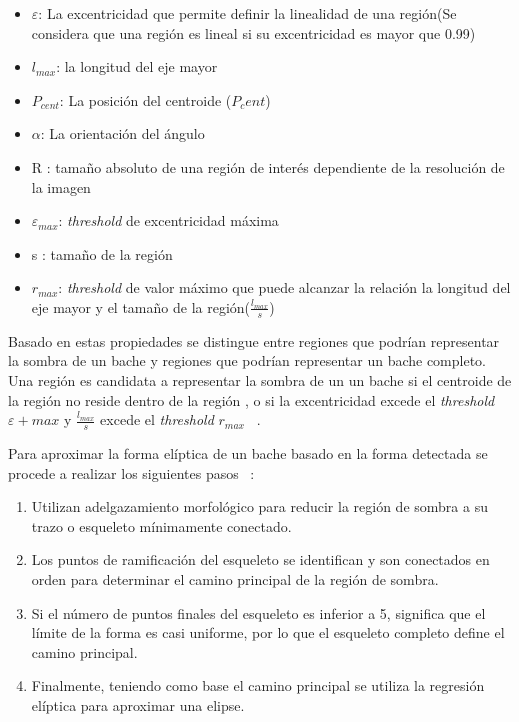 	\begin{itemize}
		\item $\varepsilon$: La excentricidad que permite definir la linealidad de una región(Se considera que una región es lineal si su excentricidad
			es mayor que 0.99)
		\item $l_{max}$: la longitud del eje mayor 
		\item $P_{cent}$: La posición del centroide ($P_cent$)
		\item $\alpha$: La orientación del ángulo
		\item R : tamaño absoluto de una región de interés dependiente de la resolución de la imagen
		\item $\varepsilon_{max}$: \emph{threshold} de excentricidad máxima
		\item s : tamaño de la región
		\item $r_{max}$: \emph{threshold} de valor máximo que puede alcanzar la relación la longitud del eje mayor y el tamaño de la región($\frac{l_{max}
			}{s}$) \end{itemize} 

	Basado en estas propiedades se distingue entre regiones que podrían representar la sombra de un bache y regiones que podrían representar un bache
	completo. Una región es candidata a representar la sombra de un un bache si el centroide de la región no reside dentro de la región , o si la
	excentricidad excede el \emph{threshold} $\varepsilon+{max}$ y $\frac{l_{max}}{s}$ excede el \emph{threshold} $r_{max}$ ~.



	Para aproximar la forma elíptica de un bache basado en la forma detectada se procede a realizar los siguientes pasos ~:

	\begin{enumerate}
		\item Utilizan adelgazamiento morfológico para reducir la región de sombra  a su trazo o esqueleto mínimamente conectado.
		\item Los puntos de ramificación del esqueleto se identifican y son conectados en orden para determinar el camino principal de la región de sombra.
		\item Si el número de puntos finales del esqueleto es inferior a 5, significa que el límite de la forma es casi uniforme, por lo que el esqueleto
			completo define el camino principal.
		\item Finalmente, teniendo como base el camino principal se utiliza la regresión elíptica para aproximar una elipse.
	\end{enumerate}

